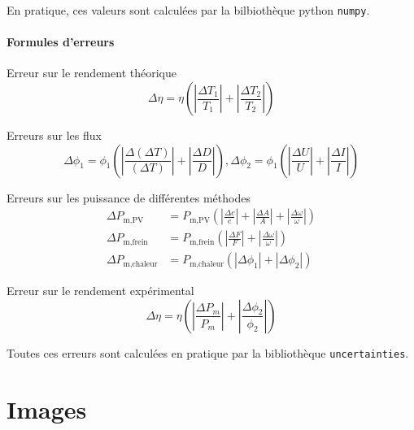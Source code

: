 En pratique, ces valeurs sont calculées par la bilbiothèque python \texttt{numpy}.

\paragraph*{Formules d'erreurs}

Erreur sur le rendement théorique
\begin{equation}
    \Delta \eta = \eta \left( \left|\frac{\Delta T_1}{T_1}\right| + \left|\frac{\Delta T_2}{T_2}\right| \right)
\end{equation}

Erreurs sur les flux
\begin{equation}
    \Delta \phi_1 = \phi_1 \left( \left|\frac{\Delta (\Delta T)}{(\Delta T)}\right| + \left|\frac{\Delta D}{D}\right| \right), 
    \Delta \phi_2 = \phi_1 \left( \left|\frac{\Delta U}{U}\right| + \left|\frac{\Delta I}{I}\right| \right)
\end{equation}

Erreurs sur les puissance de différentes méthodes
\begin{align}
    \Delta P_\textrm{m,PV} &= P_\textrm{m,PV} \left( \left|\frac{\Delta c}{c}\right| + \left|\frac{\Delta A}{A}\right| + \left|\frac{\Delta \omega}{\omega}\right| \right)\\
    \Delta P_\textrm{m,frein} &= P_\textrm{m,frein} \left( \left|\frac{\Delta F}{F}\right| + \left|\frac{\Delta \omega}{\omega}\right| \right)\\
    \Delta P_\textrm{m,chaleur} &= P_\textrm{m,chaleur} (|\Delta \phi_1| + |\Delta \phi_2|)
\end{align}

Erreur sur le rendement expérimental 
\begin{equation}
    \Delta \eta = \eta \left( \left|\frac{\Delta P_m}{P_m}\right| + \left|\frac{\Delta \phi_2}{\phi_2}\right| \right)
\end{equation}

Toutes ces erreurs sont calculées en pratique par la bibliothèque \texttt{uncertainties}.

\section{Images}
\label{sec:image}

